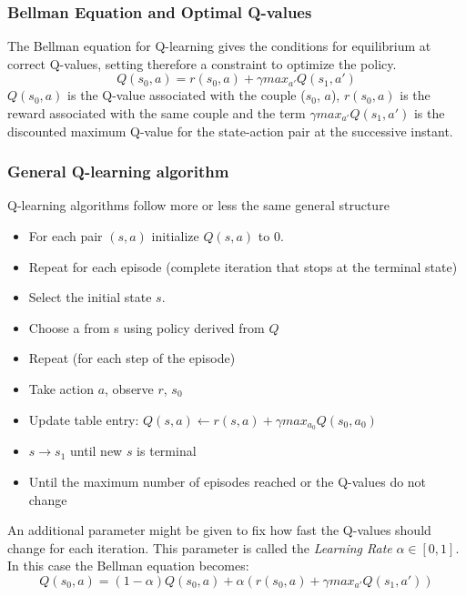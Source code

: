 \subsubsection{Bellman Equation and Optimal Q-values}

The Bellman equation for Q-learning gives the conditions for equilibrium at correct Q-values, setting therefore a constraint to optimize the policy.
\begin{equation}
Q(s_{0}, a) = r(s_{0},a ) + \gamma  max_{a'}Q(s_1, a') 
\end{equation}
$Q(s_{0}, a)$ is the Q-value associated with the couple ($s_{0}$, $a$), $r(s_{0},a )$ is the reward associated with the same couple and the term $\gamma  max_{a'}Q(s_1, a')$ is the discounted maximum Q-value for the state-action pair at the successive instant.

\subsubsection{General Q-learning algorithm}

Q-learning algorithms follow more or less the same general structure %
\begin{itemize}
    \item For each pair $(s, a)$ initialize $Q(s, a)$ to 0.
    \item Repeat for each episode (complete iteration that stops at the terminal state)
    \item Select the initial state $s$.
    \item Choose a from s using policy derived from $Q$
    \item Repeat (for each step of the episode)
    \item Take action $a$, observe $r$, $s_{0}$ 
    \item Update table entry: $Q(s,a) \leftarrow r(s,a) + \gamma max_{a_{0}}Q(s_{0},a_{0})$
    \item $s \rightarrow{} s_{1}$ until new $s$ is terminal
    \item Until the maximum number of episodes reached or the Q-values do not change
\end{itemize}

An additional parameter might be given to fix how fast the Q-values should change for each iteration.
This parameter is called the \emph{Learning Rate} $\alpha \in [0,1]$. In this case the Bellman equation becomes:
\begin{equation}
Q(s_{0}, a) = (1-\alpha)Q(s_{0}, a) + \alpha(r(s_{0},a ) + \gamma  max_{a'}Q(s_1, a')) 
\end{equation}

